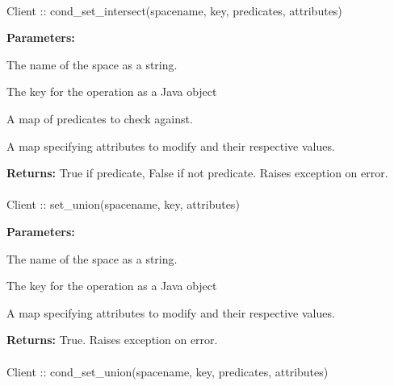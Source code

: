 \paragraph{}
\label{api:java:cond_set_intersect}
\begin{javacode}
Client :: cond_set_intersect(spacename, key, predicates, attributes)
\end{javacode}


\noindent\textbf{Parameters:}
\begin{description}[labelindent=\widthof{{\code{predicates}}},leftmargin=*,noitemsep,nolistsep,align=right]
\item[\code{spacename}] The name of the space as a string.
\item[\code{key}] The key for the operation as a Java object
\item[\code{predicates}] A map of predicates to check against.
\item[\code{attributes}] A map specifying attributes to modify and their respective values.
\end{description}

\noindent\textbf{Returns:}
True if predicate, False if not predicate.  Raises exception on error.

\paragraph{}
\label{api:java:set_union}
\begin{javacode}
Client :: set_union(spacename, key, attributes)
\end{javacode}


\noindent\textbf{Parameters:}
\begin{description}[labelindent=\widthof{{\code{attributes}}},leftmargin=*,noitemsep,nolistsep,align=right]
\item[\code{spacename}] The name of the space as a string.
\item[\code{key}] The key for the operation as a Java object
\item[\code{attributes}] A map specifying attributes to modify and their respective values.
\end{description}

\noindent\textbf{Returns:}
True.  Raises exception on error.

\paragraph{}
\label{api:java:cond_set_union}
\begin{javacode}
Client :: cond_set_union(spacename, key, predicates, attributes)
\end{javacode}


